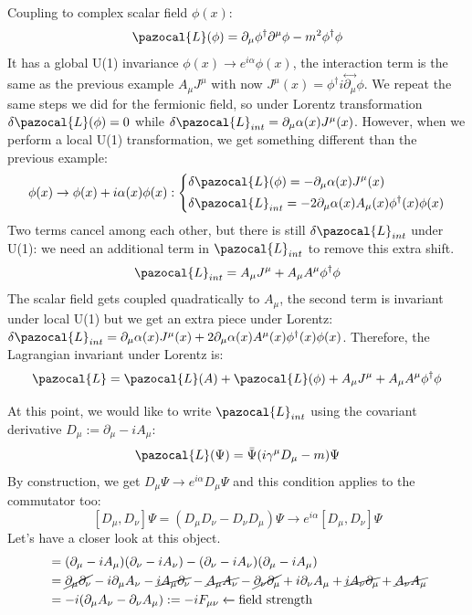 \documentclass[../main.tex]{subfiles}
\begin{document}
\begin{example}
Coupling to complex scalar field $\phi(x)$:\\
\[
\pazocal{L}(\phi)=\partial_\mu\phi^\dagger\partial^\mu\phi-m^2\phi^\dagger\phi
\]
It has a global U(1) invariance $\phi(x)\to e^{i\alpha}\phi(x)$, the interaction term is the same as the previous example $A_\mu J^\mu$ with now $J^\mu(x)=\phi^\dagger i\overset{\leftrightarrow}{\partial_\mu}\phi$. We repeat the same steps we did for the fermionic field, so under Lorentz transformation $\delta\pazocal{L}(\phi)=0$ while $\delta\pazocal{L}_{int}=\partial_\mu\alpha(x)J^\mu(x)$. However, when we perform a local U(1) transformation, we get something different than the previous example:
\[
\phi(x)\to\phi(x)+i\alpha(x)\phi(x):\left\{
\begin{aligned}
&\delta\pazocal{L}(\phi)=-\partial_\mu\alpha(x)J^\mu(x)\\
&\delta\pazocal{L}_{int}=-2\partial_\mu\alpha(x)A_\mu(x)\phi^\dagger(x)\phi(x)
\end{aligned}
\right.
\]
Two terms cancel among each other, but there is still $\delta\pazocal{L}_{int}$ under U(1): we need an additional term in $\pazocal{L}_{int}$ to remove this extra shift.
\[
\pazocal{L}_{int}=A_\mu J^\mu+A_\mu A^\mu\phi^\dagger\phi
\]
The scalar field gets coupled quadratically to $A_\mu$, the second term is invariant under local U(1) but we get an extra piece under Lorentz: $\delta\pazocal{L}_{int}=\partial_\mu\alpha(x)J^\mu(x)+2\partial_\mu\alpha(x)A^\mu(x)\phi^\dagger(x)\phi(x)$. Therefore, the Lagrangian invariant under Lorentz is:
\[
\pazocal{L}=\pazocal{L}(A)+\pazocal{L}(\phi)+A_\mu J^\mu+A_\mu A^\mu\phi^\dagger\phi
\]
\end{example}
At this point, we would like to write $\pazocal{L}_{int}$ using the covariant derivative $D_\mu:=\partial_\mu-iA_\mu$:
\[
\pazocal{L}(\Psi)=\Bar{\Psi}(i\gamma^\mu D_\mu-m)\Psi
\]
By construction, we get $D_\mu\Psi\to e^{i\alpha}D_\mu\Psi$ and this condition applies to the commutator too:
\[
[D_\mu,D_\nu]\Psi=(D_\mu D_\nu-D_\nu D_\mu)\Psi\to e^{i\alpha}[D_\mu,D_\nu]\Psi
\]
Let's have a closer look at this object.
\begin{align*}
[D_\mu,D_\nu]&=(\partial_\mu-iA_\mu)(\partial_\nu-iA_\nu)-(\partial_\nu-iA_\nu)(\partial_\mu-iA_\mu)\\
&=\cancel{\partial_\mu\partial_\nu}-i\partial_\mu A_\nu-\cancel{iA_\mu\partial_\nu}-\cancel{A_\mu A_\nu}-\cancel{\partial_\nu\partial_\mu}+i\partial_\nu A_\mu+\cancel{iA_\nu\partial_\mu}+\cancel{A_\nu A_\mu}\\
&=-i(\partial_\mu A_\nu-\partial_\nu A_\mu):=-iF_{\mu\nu}\xleftarrow[]{}\text{field strength}
\end{align*}
\end{document}
